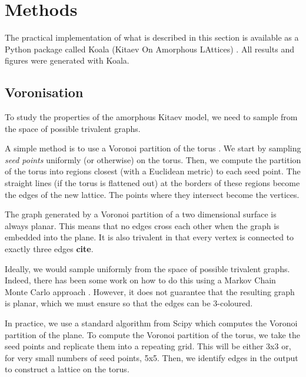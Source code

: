 \hypertarget{methods}{%
\section{Methods}\label{methods}}

The practical implementation of what is described in this section is available as a Python package called Koala (Kitaev On Amorphous LAttices) \textcite{tomImperialCMTHKoalaFirst2022}. All results and figures were generated with Koala.

\hypertarget{voronisation}{%
\subsection{Voronisation}\label{voronisation}}

To study the properties of the amorphous Kitaev model, we need to sample from the space of possible trivalent graphs.

A simple method is to use a Voronoi partition of the torus \autocite{mitchellAmorphousTopologicalInsulators2018,marsalTopologicalWeaireThorpeModels2020,florescu_designer_2009}. We start by sampling \emph{seed points} uniformly (or otherwise) on the torus. Then, we compute the partition of the torus into regions closest (with a Euclidean metric) to each seed point. The straight lines (if the torus is flattened out) at the borders of these regions become the edges of the new lattice. The points where they intersect become the vertices.

The graph generated by a Voronoi partition of a two dimensional surface is always planar. This means that no edges cross each other when the graph is embedded into the plane. It is also trivalent in that every vertex is connected to exactly three edges \textbf{cite}.

Ideally, we would sample uniformly from the space of possible trivalent graphs. Indeed, there has been some work on how to do this using a Markov Chain Monte Carlo approach \textcite{alyamiUniformSamplingDirected2016}. However, it does not guarantee that the resulting graph is planar, which we must ensure so that the edges can be 3-coloured.

In practice, we use a standard algorithm \textcite{barberQuickhullAlgorithmConvex1996} from Scipy \textcite{virtanenSciPyFundamentalAlgorithms2020a} which computes the Voronoi partition of the plane. To compute the Voronoi partition of the torus, we take the seed points and replicate them into a repeating grid. This will be either 3x3 or, for very small numbers of seed points, 5x5. Then, we identify edges in the output to construct a lattice on the torus.

